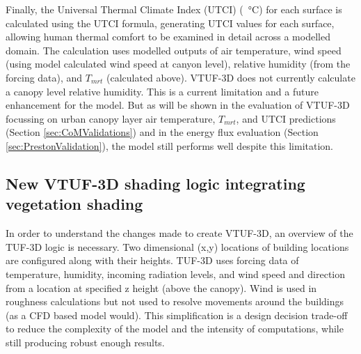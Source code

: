 \documentclass[final,3p,times,authoryear]{elsarticle}
\begin{document}
Finally, the Universal Thermal Climate Index (UTCI) (\SI{}{\degreeCelsius}) for each surface is calculated using the \cite{Brode2009u} UTCI formula, generating UTCI values for each surface, allowing human thermal comfort to be examined in detail across a modelled domain. The calculation uses modelled outputs of air temperature, wind speed (using model calculated wind speed at canyon level), relative humidity (from the forcing data), and $T_{mrt}$ (calculated above). VTUF-3D does not currently calculate a canopy level relative humidity. This is a current limitation and a future enhancement for the model. But as will be shown in the evaluation of VTUF-3D focussing on urban canopy layer air temperature, $T_{mrt}$, and UTCI predictions (Section \ref{sec:CoMValidations}) and in the energy flux evaluation (Section \ref{sec:PrestonValidation}), the model still performs well despite this limitation. 


\subsection{New VTUF-3D shading logic integrating vegetation shading}\label{sec:integration}
In order to understand the changes made to create VTUF-3D, an overview of the TUF-3D logic is necessary. Two dimensional (x,y) locations of building locations are configured along with their heights. TUF-3D uses forcing data of temperature, humidity, incoming radiation levels, and wind speed and direction from a location at specified z height (above the canopy). Wind is used in roughness calculations but not used to resolve movements around the buildings (as a CFD based model would). This simplification is a design decision trade-off to reduce the complexity of the model and the intensity of computations, while still producing robust enough results.
\end{document}
